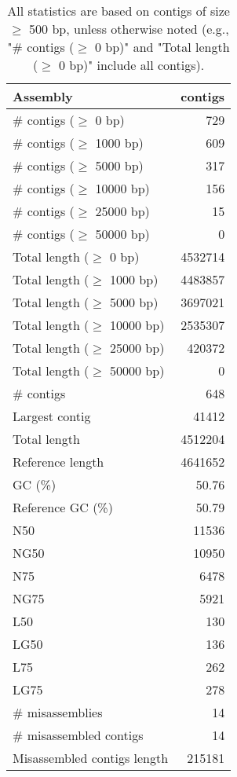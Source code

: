 \documentclass[12pt,a4paper]{article}
\begin{document}
\begin{table}[ht]
\begin{center}
\caption{All statistics are based on contigs of size $\geq$ 500 bp, unless otherwise noted (e.g., "\# contigs ($\geq$ 0 bp)" and "Total length ($\geq$ 0 bp)" include all contigs).}
\begin{tabular}{|l*{1}{|r}|}
\hline
Assembly & contigs \\ \hline
\# contigs ($\geq$ 0 bp) & 729 \\ \hline
\# contigs ($\geq$ 1000 bp) & 609 \\ \hline
\# contigs ($\geq$ 5000 bp) & 317 \\ \hline
\# contigs ($\geq$ 10000 bp) & 156 \\ \hline
\# contigs ($\geq$ 25000 bp) & 15 \\ \hline
\# contigs ($\geq$ 50000 bp) & 0 \\ \hline
Total length ($\geq$ 0 bp) & 4532714 \\ \hline
Total length ($\geq$ 1000 bp) & 4483857 \\ \hline
Total length ($\geq$ 5000 bp) & 3697021 \\ \hline
Total length ($\geq$ 10000 bp) & 2535307 \\ \hline
Total length ($\geq$ 25000 bp) & 420372 \\ \hline
Total length ($\geq$ 50000 bp) & 0 \\ \hline
\# contigs & 648 \\ \hline
Largest contig & 41412 \\ \hline
Total length & 4512204 \\ \hline
Reference length & 4641652 \\ \hline
GC (\%) & 50.76 \\ \hline
Reference GC (\%) & 50.79 \\ \hline
N50 & 11536 \\ \hline
NG50 & 10950 \\ \hline
N75 & 6478 \\ \hline
NG75 & 5921 \\ \hline
L50 & 130 \\ \hline
LG50 & 136 \\ \hline
L75 & 262 \\ \hline
LG75 & 278 \\ \hline
\# misassemblies & 14 \\ \hline
\# misassembled contigs & 14 \\ \hline
Misassembled contigs length & 215181 \\ \hline

\end{tabular}
\end{center}
\end{table}
\end{document}
